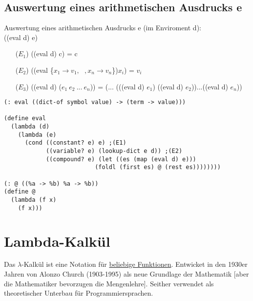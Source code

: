 \documentclass[a4paper,12pt]{article}
\begin{document}
\subsection{Auswertung eines arithmetischen Ausdrucks e}
Auswertung eines arithmetischen Ausdrucks e (im Enviroment d):\\
 ((eval d) e)
\begin{itemize}
\item[($E_1$)] ((eval d) c) = c %
\item[($E_2$)] ((eval \{$x_1\rightarrow v_1, \ \ \ ,x_n \rightarrow v_n$\})$x_i$) = $v_i$ %
\item[($E_3$)] ((eval d) ($e_1 \ e_2 \ ... \ e_n$)) = (... (((eval d) $e_1$) ((eval d) $e_2$))...((eval d) $e_n$))
\end{itemize}
\begin{lstlisting}[style=customc]
(: eval ((dict-of symbol value) -> (term -> value)))

(define eval
  (lambda (d)
    (lambda (e)
      (cond ((constant? e) e) ;(E1)
            ((variable? e) (lookup-dict e d)) ;(E2)
            ((compound? e) (let ((es (map (eval d) e)))
                          (foldl (first es) @ (rest es))))))))
      
(: @ ((%a -> %b) %a -> %b))                   
(define @
  (lambda (f x)
    (f x)))
\end{lstlisting}
\section{Lambda-Kalkül}
Das $\lambda$-Kalkül ist eine Notation für \uline{beliebige Funktionen}. Entwicket in den  1930er Jahren von Alonzo Church (1903-1995) als neue Grundlage der Mathematik [aber die Mathematiker bevorzugen die Mengenlehre]. Seither verwendet als theoretischer Unterbau für Programmiersprachen.
\end{document}

